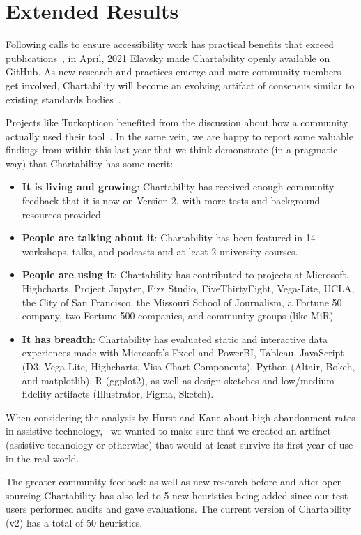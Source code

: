 \documentclass[12pt]{cmuthesis}
\begin{document}
\section{Extended Results}
Following calls to ensure accessibility work has practical benefits that exceed publications~\cite{Hurst2013Making}, in April, 2021 Elavsky made Chartability openly available on GitHub. As new research and practices emerge and more community members get involved, Chartability will become an evolving artifact of consensus similar to existing standards bodies~\cite{WAI2022WCAG3}.

Projects like Turkopticon benefited from the discussion about how a community actually used their tool~\cite{Irani2013Turkopticon}. In the same vein, we are happy to report some valuable findings from within this last year that we think demonstrate (in a pragmatic way) that Chartability has some merit: 
\begin{itemize}
    \item \textbf{It is living and growing}: Chartability has received enough community feedback that it is now on Version 2, with more tests and background resources provided.
    \item \textbf{People are talking about it}: Chartability has been featured in 14 workshops, talks, and podcasts and at least 2 university courses.
    \item \textbf{People are using it}: Chartability has contributed to projects at Microsoft, Highcharts, Project Jupyter, Fizz Studio, FiveThirtyEight, Vega-Lite, UCLA, the City of San Francisco, the Missouri School of Journalism, a Fortune 50 company, two Fortune 500 companies, and community groups (like MiR).
    \item \textbf{It has breadth}: Chartability has evaluated static and interactive data experiences made with Microsoft's Excel and PowerBI, Tableau, JavaScript (D3, Vega-Lite, Highcharts, Visa Chart Components), Python (Altair, Bokeh, and matplotlib), R (ggplot2), as well as design sketches and low/medium-fidelity artifacts (Illustrator, Figma, Sketch).
\end{itemize}

When considering the analysis by Hurst and Kane about high abandonment rates in assistive technology,~\cite{Hurst2013Making} we wanted to make sure that we created an artifact (assistive technology or otherwise) that would at least survive its first year of use in the real world. 

The greater community feedback as well as new research before and after open-sourcing Chartability has also led to 5 new heuristics being added since our test users performed audits and gave evaluations. The current version of Chartability (v2) has a total of 50 heuristics. 
\end{document}
